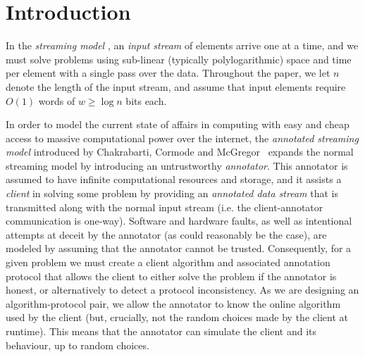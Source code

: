 \section{Introduction}
In the \emph{streaming model} \cite{munro1980selection, flajolet1985probabilistic, alon1999space}, an \emph{input stream} of elements arrive one at a time, and we must solve problems using sub-linear (typically polylogarithmic) space and time per element with a single pass over the data. 
Throughout the paper, we let $n$ denote the length of the input stream, and assume that input elements require $O(1)$ words of $w \geq \log n$ bits each.

In order to model the current state of affairs in computing with easy and cheap access to massive computational power over the internet, the \emph{annotated streaming model} introduced by Chakrabarti, Cormode and McGregor~\cite{chakrabarti2009annotations, chakrabarti2014annotations} expands the normal streaming model by introducing an untrustworthy \emph{annotator}. 
This annotator is assumed to have infinite computational resources and storage, and it assists a \emph{client} in solving some problem by providing an \emph{annotated data stream} that is transmitted along with the normal input stream (i.e. the client-annotator communication is one-way). 
Software and hardware faults, as well as intentional attempts at deceit by the annotator (as could reasonably be the case), are modeled by assuming that the annotator cannot be trusted.
Consequently, for a given problem we must create a client algorithm and associated annotation protocol that allows the client to either solve the problem if the annotator is honest, or alternatively to detect a protocol inconsistency. 
As we are designing an algorithm-protocol pair, we allow the annotator to know the online algorithm used by the client (but, crucially, not the random choices made by the client at runtime). 
This means that the annotator can simulate the client and its behaviour, up to random choices.


